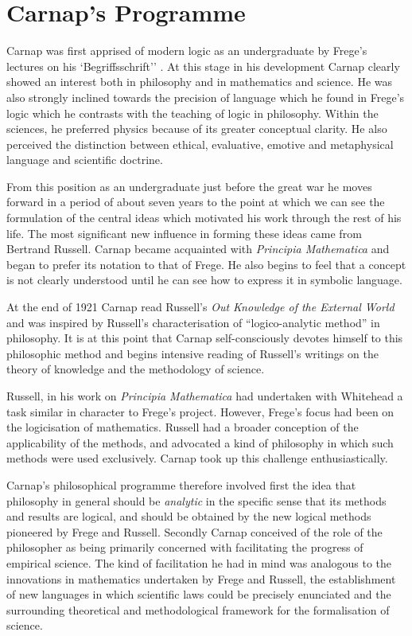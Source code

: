 \section{Carnap's Programme}

Carnap was first apprised of modern logic as an undergraduate by Frege's lectures on his `Begriffsschrift'' \cite{frege1879,heijenoort67}.
At this stage in his development Carnap clearly showed an interest both in philosophy and in mathematics and science.
He was also strongly inclined towards the precision of language which he found in Frege's logic which he contrasts with the teaching of logic in philosophy.
Within the sciences, he preferred physics because of its greater conceptual clarity.
He also perceived the distinction between ethical, evaluative, emotive and metaphysical language and scientific doctrine.

From this position as an undergraduate just before the great war he moves forward in a period of about seven years to the point at which we can see the formulation of the central ideas which motivated his work through the rest of his life.
The most significant new influence in forming these ideas came from Bertrand Russell.
Carnap became acquainted with \emph{Principia Mathematica}\cite{russell10} and began to prefer its notation to that of Frege.
He also begins to feel that a concept is not clearly understood until he can see how to express it in symbolic language.

At the end of 1921 Carnap read Russell's \emph{Out Knowledge of the External World}\cite{russell1921} and was inspired by Russell's characterisation of ``logico-analytic method'' in philosophy.
It is at this point that Carnap self-consciously devotes himself to this philosophic method and begins intensive reading of Russell's writings on the theory of knowledge and the methodology of science.

Russell, in his work on \emph{Principia Mathematica} had undertaken with Whitehead a task similar in character to Frege's project.
However, Frege's focus had been on the logicisation of mathematics.
Russell had a broader conception of the applicability of the methods, and advocated a kind of philosophy in which such methods were used exclusively.
Carnap took up this challenge enthusiastically.

Carnap's philosophical programme therefore involved first the idea that philosophy in general should be \emph{analytic} in the specific sense that its methods and results are logical, and should be obtained by the new logical methods pioneered by Frege and Russell.
Secondly Carnap conceived of the role of the philosopher as being primarily concerned with facilitating the progress of empirical science.
The kind of facilitation he had in mind was analogous to the innovations in mathematics undertaken by Frege and Russell, the establishment of new languages in which scientific laws could be precisely enunciated and the surrounding theoretical and methodological framework for the formalisation of science.

